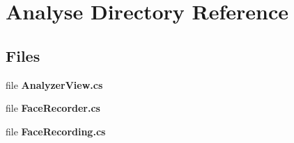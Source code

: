 \section{Analyse Directory Reference}
\label{dir_d7d7e75ee7c608ec890b3b81315c4877}
\subsection*{Files}
\begin{DoxyCompactItemize}
\item 
file \textbf{ Analyzer\+View.\+cs}
\item 
file \textbf{ Face\+Recorder.\+cs}
\item 
file \textbf{ Face\+Recording.\+cs}
\end{DoxyCompactItemize}
